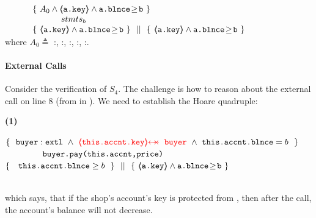 $
\begin{array}{ll}
\ \ \ \ \  &   
                     \{ \ {A_0  \wedge  \inside{\prg{a.\password}} \wedge  \prg{a.\balance}\!\geq\!{\prg{b} } } \  \} \\
		& \ \ \ \ \ \ \ \ \ \   stmts_{b} \  \\
		&
                   \{\  {\inside{\prg{a.\password}} \wedge  \prg{a.\balance}\!\geq\!{\prg{b}} }  \ \}\ \  ||\ \  \{\ \inside{\prg{a.\password}}\wedge  \prg{a.\balance}\!\geq\!{\prg{b}}   \ \} 
\end{array}
$
\\
\noindent 
 where $A_0 \triangleq $ %
:, :, :, :,  :.


 
 \label{sec:howThird}
 
\paragraph{External Calls}  Consider  the  verification of $S_4$. 
The challenge is how to reason  about the external call on line 8 (from  in ). 
We need to establish the Hoare quadruple:

 \vspace{.05cm}
  \begin{minipage}{.05\textwidth}
   \textbf{(1)}\ \ 
\end{minipage}
\hfill
\begin{minipage}{.95\textwidth}
\begin{flushleft}
$\{\  \   \external{\prg{buyer}} \ \wedge\ 
 {\color{red} {\protectedFrom {\prg{this.\myAccount.key}}  {\prg{buyer} } }}
 \ \wedge\ \prg{this.\myAccount.\balance}= b  \ \  \}$\\
$\ \ \ \ \ \ \ \ \ \ \ \ {\ \mbox{\normalfont{\texttt{buyer.pay(this.accnt,price)}}}   \ } $\\
$  \{\  \ \  {\mbox{\normalfont{\texttt{this.\mbox{\normalfont{\texttt{accnt}}}.\mbox{\normalfont{\texttt{blnce}}}}}}} \geq  b \  \  \} \ \ ||\ \  \{\ \langle\!\!\langle \mbox{\normalfont{\texttt{a.key}}} \rangle\!\!\rangle\wedge  \mbox{\normalfont{\texttt{a.\mbox{\normalfont{\texttt{blnce}}}}}}\!\geq\!{\mbox{\normalfont{\texttt{b}}}}   \ \}  $ 
\end{flushleft}
\end{minipage}
\\
\noindent
which says, that  if the shop's account's key is protected from , then after the call, the account's balance will not decrease.

